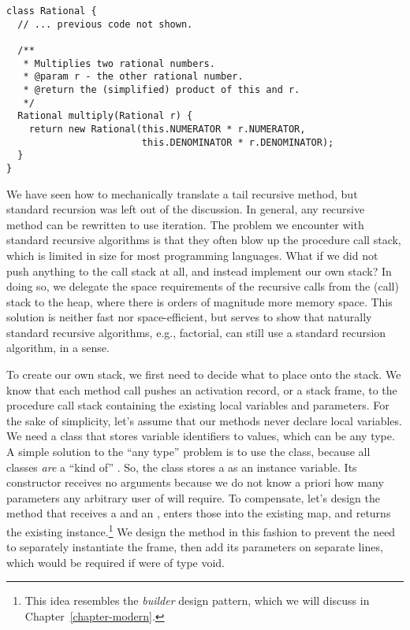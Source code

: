 \begin{lstlisting}[language=MyJava]
class Rational {
  // ... previous code not shown.

  /**
   * Multiplies two rational numbers.
   * @param r - the other rational number.
   * @return the (simplified) product of this and r.
   */
  Rational multiply(Rational r) {
    return new Rational(this.NUMERATOR * r.NUMERATOR, 
                        this.DENOMINATOR * r.DENOMINATOR);
  }
}
\end{lstlisting}

We have seen how to mechanically translate a tail recursive method, but standard recursion was left out of the discussion. 
In general, any recursive method can be rewritten to use iteration. 
The problem we encounter with standard recursive algorithms is that they often blow up the procedure call stack, which is limited in size for most programming languages. 
What if we did not push anything to the call stack at all, and instead implement our own stack? 
In doing so, we delegate the space requirements of the recursive calls from the (call) stack to the heap, where there is orders of magnitude more memory space. This solution is neither fast nor space-efficient, but serves to show that naturally standard recursive algorithms, e.g., factorial, can still use a standard recursion algorithm, in a sense.

To create our own stack, we first need to decide what to place onto the stack. 
We know that each method call pushes an activation record, or a stack frame, to the procedure call stack containing the existing local variables and parameters. 
For the sake of simplicity, let's assume that our methods never declare local variables. 
We need a class that stores variable identifiers to values, which can be any type. 
A simple solution to the ``any type'' problem is to use the  class, because all classes \emph{are} a ``kind of'' . 
So, the  class stores a  as an instance variable. 
Its constructor receives no arguments because we do not know a priori how many parameters any arbitrary user of  will require. 
To compensate, let's design the  method that receives a  and an , enters those into the existing map, and returns the existing instance.\footnote{This idea resembles the \emph{builder} design pattern, which we will discuss in Chapter~\ref{chapter-modern}.} We design the method in this fashion to prevent the need to separately instantiate the frame, then add its parameters on separate lines, which would be required if  were of type void.

